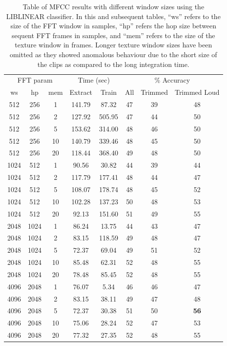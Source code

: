 \documentclass[12pt,oneside]{book}
\begin{document}
\begin{table}
\begin{tabular}{|c|c|c|c|c|c|c|c|}
\hline
\multicolumn{3}{|c|}{FFT param} & \multicolumn{2}{c|}{Time (sec)} & \multicolumn{3}{c|}{\% Accuracy} \\
\hhline{|-|-|-|-|-|-|-|-|}
ws & hp & mem & Extract & Train & All & Trimmed & Trimmed Loud \\
\hhline{|=|=|=|=|=|=|=|=|}
512  & 256  & 1    &    141.79  &    87.32  &  47  & 39 & 48 \\
512  & 256  & 2    &    127.92  &   505.95  &  47  & 44 & 50 \\
512  & 256  & 5    &    153.62  &   314.00  &  48  & 46 & 50 \\
512  & 256  & 10   &    140.79  &   339.46  &  48  & 45 & 50 \\
512  & 256  & 20   &    118.44  &   368.40  &  49  & 48 & 50 \\
\hline
1024 & 512  & 1    &     90.56  &    30.82  &  44  & 39 & 44 \\
1024 & 512  & 2    &    117.79  &   177.41  &  48  & 44 & 47 \\
1024 & 512  & 5    &    108.07  &   178.74  &  48  & 45 & 52 \\
1024 & 512  & 10   &    102.28  &   137.23  &  50  & 48 & 53 \\
1024 & 512  & 20   &     92.13  &   151.60  &  51  & 49 & 55 \\
\hline
2048 & 1024 & 1    &     86.24  &    13.75  &  44  & 43 & 47 \\
2048 & 1024 & 2    &     83.15  &   118.59  &  49  & 48 & 47 \\
2048 & 1024 & 5    &     72.37  &    69.04  &  49  & 51 & 52 \\
2048 & 1024 & 10   &     85.48  &    62.31  &  52  & 48 & 55 \\
2048 & 1024 & 20   &     78.48  &    85.45  &  52  & 48 & 55 \\
\hline
4096 & 2048 & 1    &     76.07  &     5.34  &  46  & 46 & 47 \\
4096 & 2048 & 2    &     83.15  &    38.11  &  49  & 47 & 48 \\
4096 & 2048 & 5    &     72.37  &    30.38  &  51  & 50 & \textbf{56} \\
4096 & 2048 & 10   &     75.06  &    28.24  &  52  & 47 & 53\\
4096 & 2048 & 20   &     77.32  &    27.35  &  52  & 48 & 55 \\
\hline
\end{tabular}
\caption{Table of MFCC results with different window
  sizes using the LIBLINEAR classifier.  In this and subsequent
  tables, ``ws'' refers to the size of the FFT window in samples,
  ``hp'' refers the hop size between sequent FFT frames in samples,
  and ``mem'' refers to the size of the texture window in frames.
  Longer texture window sizes have been omitted as they showed
  anomalous behaviour due to the short size of the clips as compared
  to the long integration time.}
\label{table:calls-fft}
\end{table}
\end{document}
